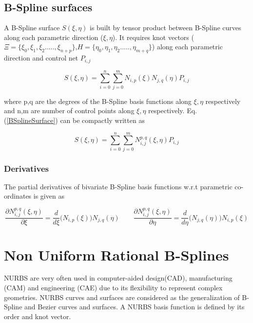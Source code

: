 \documentclass[12pt]{article}
\begin{document}
\subsection{B-Spline surfaces}
A B-Spline surface $S(\xi,\eta)$ is built by tensor product between B-Spline curves along each parametric direction ($\xi,\eta$). It requires knot vectors ($\Xi = \{ \xi_0,\xi_1,\xi_2.....,\xi_{n+p}\}$,$H = \{\eta_0,\eta_1,\eta_2.....,\eta_{m+q}\}$) along each parametric direction and control net $P_{i,j}$


\begin{equation} \label{BSplineSurface}
S(\xi,\eta) = \sum_{i=0}^{n}\sum_{j=0}^{m} N_{i,p}(\xi) N_{j,q}(\eta) P_{i,j}
\end{equation}

\noindent
where
p,q are the degrees of the B-Spline basis functions along $\xi,\eta$ respectively and n,m are number of control points along $\xi,\eta$ respectively.
\noindent
Eq. (\ref{BSplineSurface}) can be compactly written as

\begin{equation} \label{BSplineSurface}
S(\xi,\eta) = \sum_{i=0}^{n}\sum_{j=0}^{m} N_{i,j}^{p,q}(\xi,\eta) P_{i,j}
\end{equation}

\subsubsection{Derivatives}

The partial derivatives of bivariate B-Spline basis functions w.r.t parametric co-ordinates is given as

\begin{equation} 
\frac{\partial N_{i,j}^{p,q}(\xi,\eta)}{\partial \xi} = \frac{d}{d\xi} \bigg(N_{i,p}(\xi)\bigg)N_{j,q}(\eta) 
\qquad
\frac{\partial N_{i,j}^{p,q}(\xi,\eta)}{\partial \eta} = \frac{d}{d\eta} \bigg(N_{j,q}(\eta)\bigg)N_{i,p}(\xi)
\end{equation}















\section{Non Uniform Rational B-Splines } \label{NURBS}
NURBS are very often used in computer-aided design(CAD), manufacturing (CAM) and engineering (CAE) due to its flexibility to represent complex geometries. NURBS curves and surfaces are considered as the generalization of B-Spline and Bezier curves and surfaces. A NURBS basis function is defined by its order and knot vector.
\end{document}
